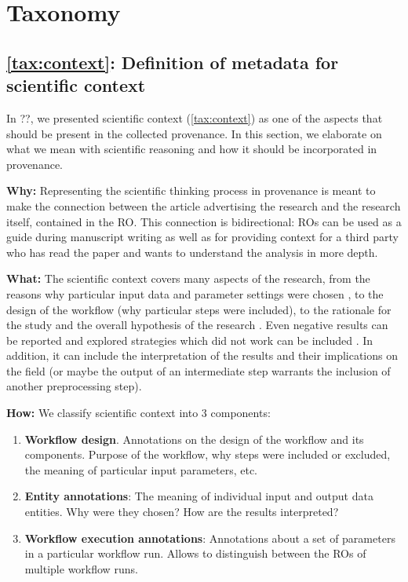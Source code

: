 \section{Taxonomy}

\subsection{\ref{tax:context}: Definition of metadata for scientific context}
\label{sec:reasoning_reqs}

In ??, we presented scientific context (\ref{tax:context}) as one of the aspects that should be present in the collected provenance. In this section, we elaborate on what we mean with scientific reasoning and how it should be incorporated in provenance.

\textbf{Why:} Representing the scientific thinking process in provenance is meant to make the connection between the article advertising the research and the research itself, contained in the RO. This connection is bidirectional: ROs can be used as a guide during manuscript writing as well as for providing context for a third party who has read the paper and wants to understand the analysis in more depth.

\textbf{What:} The scientific context covers many aspects of the research, from the reasons why particular input data and parameter settings were chosen \cite{committeeonreproducibilityandreplicabilityinscienceReproducibilityReplicabilityScience2019}, to the design of the workflow (why particular steps were included), to the rationale for the study and the overall hypothesis of the research \cite{belhajjameResearchObjectSuite2014}\cite{grykWorkflowsProvenanceInformation2017}. Even negative results can be reported and explored strategies which did not work can be included \cite{stoddenEnhancingReproducibilityComputational2016}. In addition, it can include the interpretation of the results and their implications on the field (or maybe the output of an intermediate step warrants the inclusion of another preprocessing step).

\textbf{How:} We classify scientific context into 3 components:
\begin{enumerate}[label=\textbf{SC\arabic*}]
    \item \textbf{Workflow design}. Annotations on the design of the workflow and its components. Purpose of the workflow, why steps were included or excluded, the meaning of particular input parameters, etc. \label{req:sr_wf}
    \item \textbf{Entity annotations}: The meaning of individual input and output data entities. Why were they chosen? How are the results interpreted? \label{req:sr_data}
    \item \textbf{Workflow execution annotations}: Annotations about a set of parameters in a particular workflow run. Allows to distinguish between the ROs of multiple workflow runs. \label{req:sr_ex}
\end{enumerate}